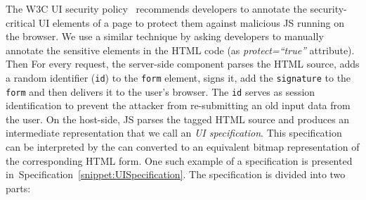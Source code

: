  The W3C UI security policy~\cite{w3c_spec} recommends developers to annotate the security-critical UI elements of a page to protect them against malicious JS running on the browser. We use a similar technique by asking developers to manually annotate the sensitive elements in the HTML code (as \emph{protect=``true''} attribute). Then For every request, the \name server-side component parses the HTML source, adds a random identifier (\texttt{id}) to the \texttt{form} element, signs it, add the \texttt{signature} to the \texttt{form} and then delivers it to the user's browser. The \texttt{id} serves as session identification to prevent the attacker from re-submitting an old input data from the user. On the host-side, \name JS parses the tagged HTML source and produces an intermediate representation that we call an \emph{UI specification}. This specification can be interpreted by the \device can converted to an equivalent bitmap representation of the corresponding HTML form.  One such example of a specification is presented in~Specification~\ref{snippet:UISpecification}. The specification is divided into two parts:

